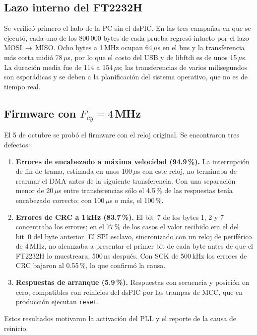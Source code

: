 \documentclass[11pt]{article}
\newcommand{\code}[1]{\texttt{#1}}
\newcommand{\us}{\,$\mu$s}
\begin{document}
\subsection{Lazo interno del FT2232H}

Se verificó primero el lado de la PC sin el dsPIC. En las tres campañas en
que se ejecutó, cada uno de los 800\,000 bytes de cada prueba regresó intacto
por el lazo MOSI\,$\to$\,MISO. Ocho bytes a 1\,MHz ocupan 64\us{} en el bus y la
transferencia más corta midió 78\us, por lo que el costo del USB y de
libftdi es de unos 15\us. La duración media fue de 114 a 154\us; las
transferencias de varios milisegundos son esporádicas y se deben a la
planificación del sistema operativo, que no es de tiempo real.

\subsection{Firmware con $F_{cy} = 4$\,MHz}
\label{sec:4mhz}

El 5 de octubre se probó el firmware con el reloj original. Se encontraron
tres defectos:

\begin{enumerate}
\item \textbf{Errores de encabezado a máxima velocidad (94.9\,\%).} La
  interrupción de fin de trama, estimada en unos 100\us{} con este reloj, no
  terminaba de rearmar el DMA antes de la siguiente transferencia. Con una
  separación menor de 20\us{} entre transferencias sólo el 4.5\,\% de las
  respuestas tenía encabezado correcto; con 100\us{} o más, el 100\,\%.
\item \textbf{Errores de CRC a 1\,kHz (83.7\,\%).} El bit~7 de los bytes 1, 2
  y 7 concentraba los errores; en el 77\,\% de los casos el valor recibido
  era el del bit~0 del byte anterior. El SPI esclavo, sincronizado con un
  reloj de periférico de 4\,MHz, no alcanzaba a presentar el primer bit de
  cada byte antes de que el FT2232H lo muestreara, 500\,ns después. Con SCK
  de 500\,kHz los errores de CRC bajaron al 0.55\,\%, lo que confirmó la
  causa.
\item \textbf{Respuestas de arranque (5.9\,\%).} Respuestas con secuencia y
  posición en cero, compatibles con reinicios del dsPIC por las trampas de
  MCC, que en producción ejecutan \code{reset}.
\end{enumerate}

Estos resultados motivaron la activación del PLL y el reporte de la causa de
reinicio.
\end{document}
